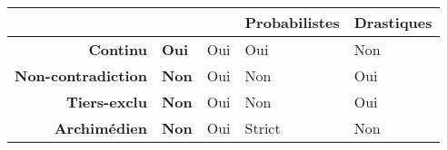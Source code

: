 \begin{tabular}{r>{\small}C{.15\textwidth}>{\small}C{.15\textwidth}>{\small}C{.15\textwidth}>{\small}C{.15\textwidth}}
  \toprule
  & \bfseries \textcite{Zadeh1965}&\bfseries {}&\bfseries
                                                   Probabilistes &\bfseries Drastiques\\
  \midrule
  \bfseries Continu & \bfseries Oui & Oui & Oui & Non \\
  \bfseries Non-contradiction & \bfseries Non & Oui & Non & Oui \\
  \bfseries Tiers-exclu & \bfseries Non & Oui & Non & Oui \\
  \bfseries Archimédien & \bfseries Non & Oui & Strict & Non \\
  \bottomrule
\end{tabular}
